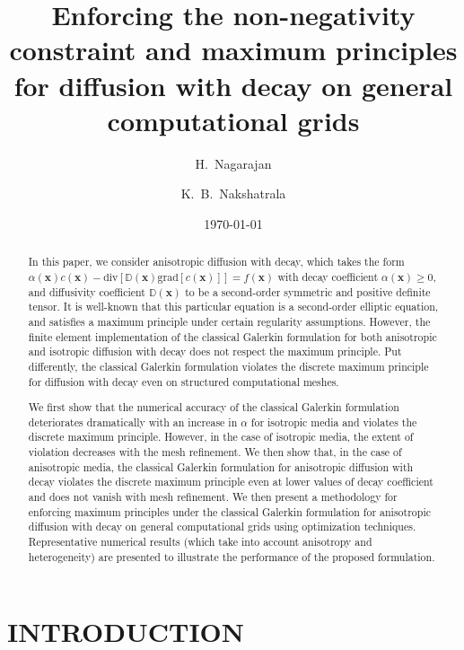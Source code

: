 \documentclass[11pt]{amsart}
\title{Enforcing the non-negativity constraint and maximum principles 
for diffusion with decay on general computational grids}
\author{H.~Nagarajan} \author{K.~B.~Nakshatrala}
\date{\today}
\begin{document}
\begin{abstract}
  In this paper, we consider anisotropic diffusion with decay, which takes the form $\alpha(\mathbf{x}) 
  c(\mathbf{x}) - \mathrm{div}[\mathbb{D}(\mathbf{x})\mathrm{grad}[c(\mathbf{x})]] = f(\mathbf{x})$ with 
  decay coefficient $\alpha(\mathbf{x}) \geq 0$, and diffusivity coefficient $\mathbb{D}(\mathbf{x})$ to 
  be a second-order symmetric and positive definite tensor. It is well-known that this particular equation 
  is a second-order elliptic equation, and satisfies a maximum principle under certain regularity 
  assumptions. However, the finite element implementation of the classical Galerkin formulation for 
  both anisotropic and isotropic diffusion with decay does not respect the maximum principle. Put 
  differently, the classical Galerkin formulation violates the discrete maximum principle for diffusion 
  with decay even on structured computational meshes. 
  
  We first show that the numerical accuracy of the classical Galerkin formulation deteriorates 
  dramatically with an increase in $\alpha$ for isotropic media and violates the discrete maximum 
  principle. However, in the case of isotropic media, the extent of violation decreases with the mesh 
  refinement. We then show that, in the case of anisotropic media, the classical Galerkin formulation 
  for anisotropic diffusion with decay violates the discrete maximum principle even at lower values of 
  decay coefficient and does not vanish with mesh refinement. We then present a methodology for 
  enforcing maximum principles under the classical Galerkin formulation for anisotropic diffusion 
  with decay on general computational grids using optimization techniques. Representative 
  numerical results (which take into account anisotropy and heterogeneity) are presented to 
  illustrate the performance of the proposed formulation. 
\end{abstract}

\maketitle 



\section{INTRODUCTION}
\label{Sec:Decay_Introduction}
\end{document}
